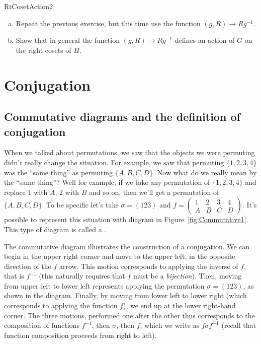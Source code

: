 \begin{exercise}{RtCosetAction2}
\begin{enumerate}[(a)]
\item Repeat the previous exercise, but this time use the function $(g,R)\rightarrow Rg^{-1}$.
\item Show that in general the function $(g,R)\rightarrow Rg^{-1}$ defines an action of $G$ on the right cosets of $H$.  
\end {enumerate}
\end {exercise}




\section{Conjugation}\label{Conjugation}
\subsection{Commutative diagrams and the definition of conjugation}
When we talked about permutations, we saw that the objects we were permuting didn't really change the situation.  For example, we saw that permuting $\{1,2,3,4\}$ was the ``same thing'' as permuting $\{A,B,C,D\}$. Now what do we really mean by the ``same thing''? Well for example, if we take any permutation of $\{1,2,3,4\}$ and replace $1$ with $A$, $2$ with $B$ and so on, then we'll get a permutation of $\{A,B,C,D\}$. To be specific let's take $\sigma=(123)$ and $f=\begin{pmatrix} 1&2&3&4\\A&B&C&D\end {pmatrix}$.  It's possible to represent this situation with diagram in Figure~\ref{fig:Commutative1}. This type of diagram is called a .


The commutative diagram illustrates the construction of a conjugation. We can begin in the upper right corner and move to the upper left, in the opposite direction of the $f$ arrow. This motion corresponds to
applying the inverse of $f$, that is 
 $f^{-1}$ (this naturally requires that $f$ must be a \emph{bijection}).  Then, moving from upper left to lower left represents applying the permutation $\sigma=(123)$, as shown in the diagram.  Finally, by moving from lower left to lower right (which corresponds to 
applying the function $f$), we end up at the lower right-hand corner. The three motions, performed one after the other thus corresponds to the composition of functions $f^{-1}$, then $\sigma$, then $f$, which we write as
$f \sigma f^{-1}$ (recall that function composition proceeds from right to left). 

